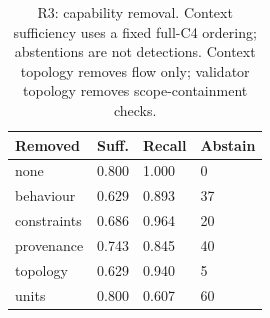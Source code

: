 \begin{table}[t]
\centering\footnotesize
\caption{R3: capability removal. Context sufficiency uses a fixed full-C4 ordering; abstentions are not detections. Context topology removes flow only; validator topology removes scope-containment checks.}
\label{tab:revision-ablation}
\begin{tabular}{@{}llll@{}}
\toprule
Removed & Suff. & Recall & Abstain \\
\midrule
none & 0.800 & 1.000 & 0 \\
behaviour & 0.629 & 0.893 & 37 \\
constraints & 0.686 & 0.964 & 20 \\
provenance & 0.743 & 0.845 & 40 \\
topology & 0.629 & 0.940 & 5 \\
units & 0.800 & 0.607 & 60 \\
\bottomrule
\end{tabular}
\end{table}
